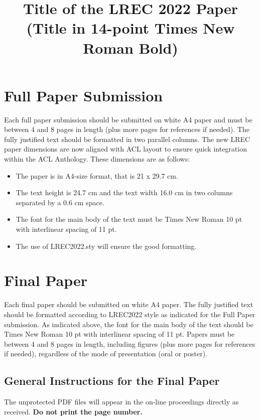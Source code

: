 \documentclass[10pt, a4paper]{article}
\title{Title of the LREC 2022 Paper (Title in 14-point Times New Roman Bold)\\ \vspace*{.5\baselineskip} \normalfont{ The Title \ul{Must Be} Capitalised as in:\\ \vspace*{.5\baselineskip} \textbf{The Rise and Fall of Ziggy Stardust and the Spiders from Mars}}}
\begin{document}
\maketitleabstract

\section{Full Paper Submission}

Each full paper submission should be submitted on white A4 paper and must be between 4 and 8 pages in length (plus more pages for references if needed). 
The fully justified text should be formatted in two parallel columns. The new LREC paper dimensions are now aligned with ACL layout to ensure quick integration within the ACL Anthology. These dimensions are as follows:   
\begin{itemize}
    \item{The paper is in A4-size format, that is 21 x 29.7 cm.}
    \item{The text height is 24.7 cm and the text width 16.0 cm in two columns separated by a 0.6 cm space.}
     \item {The font for the main body of the text must be Times New Roman 10 pt with interlinear spacing of 11 pt.}
     \item {The use of LREC2022.sty will ensure the good formatting.}
 \end{itemize}


\section{ Final Paper}

Each final paper should be submitted on white A4 paper. The fully justified text should be formatted according to LREC2022 style as indicated for the Full Paper submission.
As indicated above, the font for the main body of the text should be Times  New Roman 10 pt with interlinear spacing of 11 pt. Papers must be between 4 and 8 pages in length, including figures (plus more pages for references if needed), regardless of the mode of presentation (oral or poster).

\subsection{General Instructions for the Final Paper}
The unprotected PDF files will appear in the on-line proceedings directly as received. \textbf{Do not print the page number.}
\end{document}
